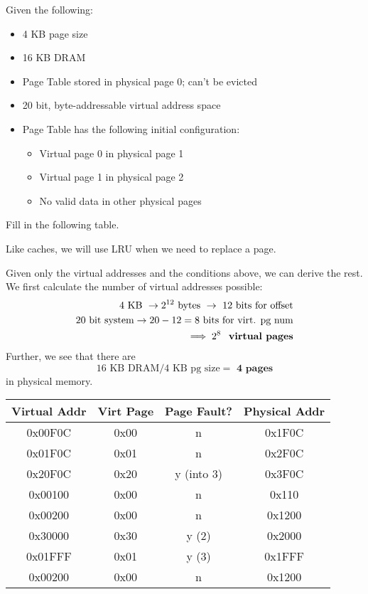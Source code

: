 \begin{problem}
  Given the following:
  \begin{itemize}
    \item 4 KB page size
    \item 16 KB DRAM
    \item Page Table stored in physical page 0; can't be evicted
    \item 20 bit, byte-addressable virtual address space
    \item Page Table has the following initial configuration:
    \begin{itemize}
      \item Virtual page 0 in physical page 1
      \item Virtual page 1 in physical page 2
      \item No valid data in other physical pages
    \end{itemize}
  \end{itemize}
  Fill in the following table.
  \begin{remark}
    Like caches, we will use LRU when we need to replace a page.
  \end{remark}
\end{problem}
\begin{answer}
  Given only the virtual addresses and the conditions above, we can derive the rest. We first calculate the number of virtual addresses possible:
  \begin{align*}
    \text{4 KB } \to 2^{12} \text{ bytes } \to \text{ 12 bits for offset} \\
    \text{20 bit system} \to 20 - 12 = 8 \text{ bits for virt. pg num} \\
    \implies \textbf{$2^8$ \text{ virtual pages}}  
  \end{align*}
  Further, we see that there are
  \[
    \text{16 KB DRAM} / \text{4 KB pg size} = \textbf{ 4 pages}
  \]
  in physical memory.
  \begin{center}
    \begin{tabular}{|c|c|c|c|}
      \hline
      Virtual Addr & Virt Page & Page Fault? & Physical Addr \\
      \hline
      0x00F0C & 0x00 & n & 0x1F0C \\
      0x01F0C & 0x01 & n & 0x2F0C \\
      0x20F0C & 0x20 & y (into 3) & 0x3F0C \\
      0x00100 & 0x00 & n & 0x110 \\
      0x00200 & 0x00 & n & 0x1200 \\
      0x30000 & 0x30 & y (2) & 0x2000 \\
      0x01FFF & 0x01 & y (3) & 0x1FFF \\
      0x00200 & 0x00 & n & 0x1200 \\
      \hline
    \end{tabular}
  \end{center}
\end{answer}
